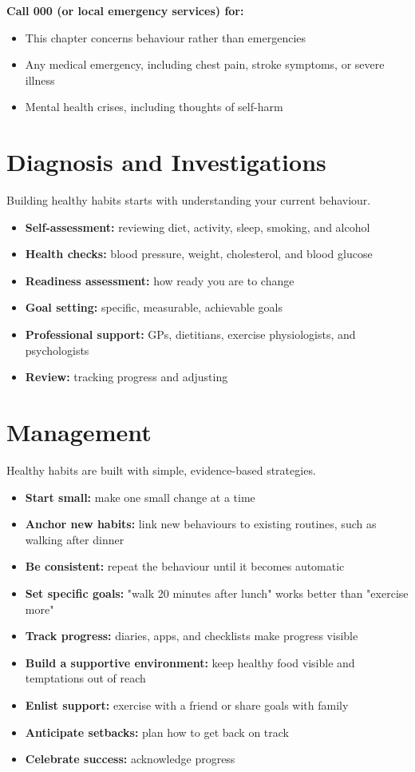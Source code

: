 \textbf{Call 000 (or local emergency services) for:}
\begin{itemize}
    \item This chapter concerns behaviour rather than emergencies
    \item Any medical emergency, including chest pain, stroke symptoms, or severe illness
    \item Mental health crises, including thoughts of self-harm
\end{itemize}

\section*{Diagnosis and Investigations}
Building healthy habits starts with understanding your current behaviour.

\begin{itemize}
    \item \textbf{Self-assessment:} reviewing diet, activity, sleep, smoking, and alcohol
    \item \textbf{Health checks:} blood pressure, weight, cholesterol, and blood glucose
    \item \textbf{Readiness assessment:} how ready you are to change
    \item \textbf{Goal setting:} specific, measurable, achievable goals
    \item \textbf{Professional support:} GPs, dietitians, exercise physiologists, and psychologists
    \item \textbf{Review:} tracking progress and adjusting
\end{itemize}

\section*{Management}
Healthy habits are built with simple, evidence-based strategies.

\begin{itemize}
    \item \textbf{Start small:} make one small change at a time
    \item \textbf{Anchor new habits:} link new behaviours to existing routines, such as walking after dinner
    \item \textbf{Be consistent:} repeat the behaviour until it becomes automatic
    \item \textbf{Set specific goals:} "walk 20 minutes after lunch" works better than "exercise more"
    \item \textbf{Track progress:} diaries, apps, and checklists make progress visible
    \item \textbf{Build a supportive environment:} keep healthy food visible and temptations out of reach
    \item \textbf{Enlist support:} exercise with a friend or share goals with family
    \item \textbf{Anticipate setbacks:} plan how to get back on track
    \item \textbf{Celebrate success:} acknowledge progress
\end{itemize}

